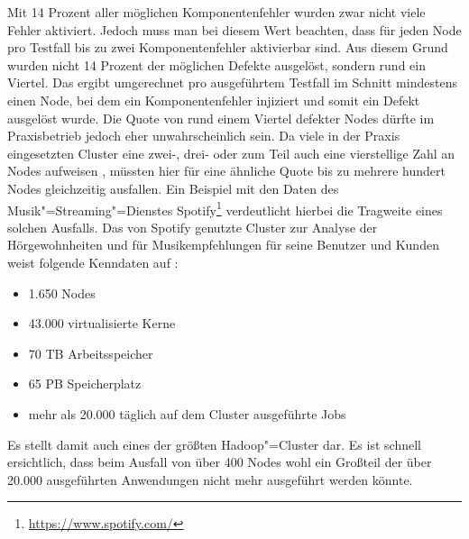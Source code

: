 Mit 14 Prozent aller möglichen Komponentenfehler wurden zwar nicht viele Fehler aktiviert.
Jedoch muss man bei diesem Wert beachten, dass für jeden Node pro Testfall bis zu zwei Komponentenfehler aktivierbar sind.
Aus diesem Grund wurden nicht 14 Prozent der möglichen Defekte ausgelöst, sondern rund ein Viertel.
Das ergibt umgerechnet pro ausgeführtem Testfall im Schnitt mindestens einen Node, bei dem ein Komponentenfehler injiziert und somit ein Defekt ausgelöst wurde.
Die Quote von rund einem Viertel defekter Nodes dürfte im Praxisbetrieb jedoch eher unwahrscheinlich sein.
Da viele in der Praxis eingesetzten Cluster eine zwei-, drei- oder zum Teil auch eine vierstellige Zahl an Nodes aufweisen \cite{PoweredByHadoop}, müssten hier für eine ähnliche Quote bis zu mehrere hundert Nodes gleichzeitig ausfallen.
Ein Beispiel mit den Daten des Musik"=Streaming"=Dienstes Spotify\footnote{\url{https://www.spotify.com/}} verdeutlicht hierbei die Tragweite eines solchen Ausfalls.
Das von Spotify genutzte Cluster zur Analyse der Hörgewohnheiten und für Musikempfehlungen für seine Benutzer und Kunden weist folgende Kenndaten auf \cite{PoweredByHadoop}:

\begin{itemize}
    \item 1.650 Nodes
    \item 43.000 virtualisierte Kerne
    \item 70 TB Arbeitsspeicher
    \item 65 PB Speicherplatz
    \item mehr als 20.000 täglich auf dem Cluster ausgeführte Jobs
\end{itemize}

Es stellt damit auch eines der größten Hadoop"=Cluster dar.
Es ist schnell ersichtlich, dass beim Ausfall von über 400 Nodes wohl ein Großteil der über 20.000 ausgeführten Anwendungen nicht mehr ausgeführt werden könnte.

